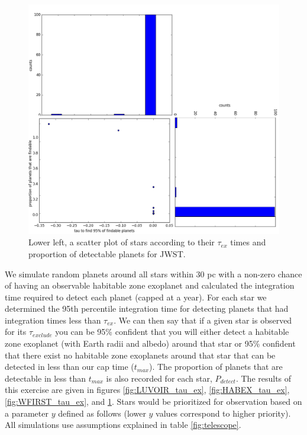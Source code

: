 \documentclass{article}
\begin{document}
	\begin{figure}
		\includegraphics[width = \linewidth]{findable_v_tau_ex_JWST_composite.png}
		\caption{Lower left, a scatter plot of stars according to their $\tau_{ex}$ times and proportion of detectable planets for JWST.}
		\label{fig:JWST_tau_ex}
	\end{figure}
	
	We simulate random planets around all stars within 30 pc with a non-zero chance of having an observable habitable zone exoplanet and calculated the integration time required to detect each planet (capped at a year). For each star we determined the 95th percentile integration time for detecting planets that had integration times less than $\tau_{ex}$. We can then say that if a given star is observed for its $\tau_{exclude}$ you can be 95\% confident that you will either detect a habitable zone exoplanet (with Earth radii and albedo) around that star or 95\% confident that there exist no habitable zone exoplanets around that star that can be detected in less than our cap time ($t_{max}$).
	The proportion of planets that are detectable in less than $t_{max}$ is also recorded for each star, $P_{detect}$. The results of this exercise are given in figures \ref{fig:LUVOIR_tau_ex}, \ref{fig:HABEX_tau_ex}, \ref{fig:WFIRST_tau_ex}, and \ref{fig:JWST_tau_ex}. Stars would be prioritized for observation based on a parameter $y$ defined as follows (lower $y$ values correspond to higher priority). All simulations use assumptions explained in table \ref{fig:telescope}.
	
\end{document}
